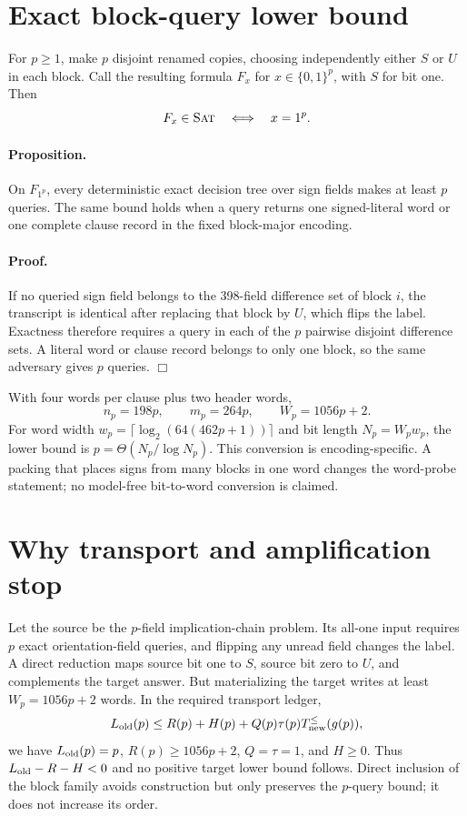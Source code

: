 \documentclass[11pt]{article}
\newcommand{\st}{\textsc{Sat}}
\begin{document}
\section{Exact block-query lower bound}

For $p\geq1$, make $p$ disjoint renamed copies, choosing independently either $S$ or $U$
in each block.  Call the resulting formula $F_x$ for $x\in\{0,1\}^p$, with $S$ for bit one.
Then
\[
 F_x\in\st \quad\Longleftrightarrow\quad x=1^p.
\]

\paragraph{Proposition.}
On $F_{1^p}$, every deterministic exact decision tree over sign fields makes at least $p$
queries.  The same bound holds when a query returns one signed-literal word or one complete
clause record in the fixed block-major encoding.

\paragraph{Proof.}
If no queried sign field belongs to the 398-field difference set of block $i$, the transcript
is identical after replacing that block by $U$, which flips the label.  Exactness therefore
requires a query in each of the $p$ pairwise disjoint difference sets.  A literal word or
clause record belongs to only one block, so the same adversary gives $p$ queries. \hfill$\Box$

With four words per clause plus two header words,
\[
 n_p=198p,\qquad m_p=264p,\qquad W_p=1056p+2.
\]
For word width $w_p=\lceil\log_2(64(462p+1))\rceil$ and bit length
$N_p=W_pw_p$, the lower bound is $p=\Theta(N_p/\log N_p)$.  This conversion is
encoding-specific.  A packing that places signs from many blocks in one word changes the
word-probe statement; no model-free bit-to-word conversion is claimed.

\section{Why transport and amplification stop}

Let the source be the $p$-field implication-chain problem.  Its all-one input requires $p$
exact orientation-field queries, and flipping any unread field changes the label.  A direct
reduction maps source bit one to $S$, source bit zero to $U$, and complements the target
answer.  But materializing the target writes at least $W_p=1056p+2$ words.  In the required
transport ledger,
\[
 L_{\rm old}(p)\leq R(p)+H(p)+Q(p)\tau(p)T_{\rm new}^{\leq}(g(p)),
\]
we have $L_{\rm old}(p)=p$, $R(p)\geq1056p+2$, $Q=\tau=1$, and $H\geq0$.
Thus $L_{\rm old}-R-H<0$ and no positive target lower bound follows.  Direct inclusion of
the block family avoids construction but only preserves the $p$-query bound; it does not
increase its order.
\end{document}
